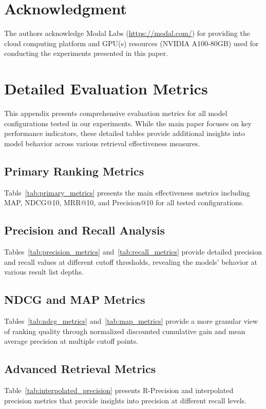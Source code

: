 \documentclass[conference]{IEEEtran}
\begin{document}
\section*{Acknowledgment}
The authors acknowledge Modal Labs (\url{https://modal.com/}) for providing the cloud computing platform and GPU(s) resources (NVIDIA A100-80GB) used for conducting the experiments presented in this paper.


 

\appendix

\section{Detailed Evaluation Metrics}
\label{app:metrics}

This appendix presents comprehensive evaluation metrics for all model configurations tested in our experiments. While the main paper focuses on key performance indicators, these detailed tables provide additional insights into model behavior across various retrieval effectiveness measures.

\subsection{Primary Ranking Metrics}
Table~\ref{tab:primary_metrics} presents the main effectiveness metrics including MAP, NDCG@10, MRR@10, and Precision@10 for all tested configurations.

\subsection{Precision and Recall Analysis}
Tables~\ref{tab:precision_metrics} and~\ref{tab:recall_metrics} provide detailed precision and recall values at different cutoff thresholds, revealing the models' behavior at various result list depths.

\subsection{NDCG and MAP Metrics}
Tables~\ref{tab:ndcg_metrics} and~\ref{tab:map_metrics} provide a more granular view of ranking quality through normalized discounted cumulative gain and mean average precision at multiple cutoff points.

\subsection{Advanced Retrieval Metrics}
Table~\ref{tab:interpolated_precision} presents R-Precision and interpolated precision metrics that provide insights into precision at different recall levels.
\end{document}
